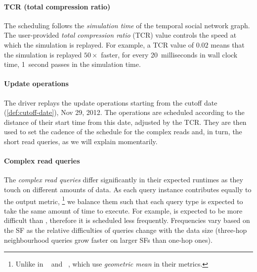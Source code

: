 \paragraph{TCR (total compression ratio)}
%
The scheduling follows the \emph{simulation time} of the temporal social network graph.
The user-provided \emph{total compression ratio} (TCR) value controls the speed at which the simulation is replayed.
For example, a TCR value of $0.02$ means that the simulation is replayed $50\times$ faster, \ie for every 20~milliseconds in wall clock time, 1~second passes in the simulation time.

\paragraph{Update operations}
%
The driver replays the update operations starting from the cutoff date (\autoref{def:cutoff-date}), Nov 29, 2012.
The operations are scheduled according to the distance of their start time from this date, adjusted by the TCR.
They are then used to set the cadence of the schedule for the complex reads and, in turn, the short read queries, as we will explain momentarily.

\paragraph{Complex read queries}
%
The \emph{complex read queries} differ significantly in their expected runtimes as they touch on different amounts of data.
As each query instance contributes equally to the output metric,%
\footnote{Unlike in \tpcH~\cite{tpch} and \snbbi~\cite{DBLP:journals/pvldb/SzarnyasWSSBWZB22}, which use \emph{geometric mean} in their metrics.}
we balance them such that each query type is expected to take the same amount of time to execute.
For example, \CR[14 (new)] is expected to be more difficult than \CR[13], therefore it is scheduled less frequently.
Frequencies vary based on the SF as the relative difficulties of queries change with the data size
(\eg three-hop neighbourhood queries grow faster on larger SFs than one-hop ones).

